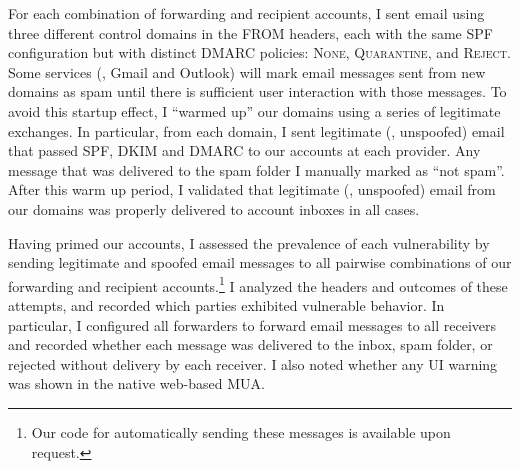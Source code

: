 For each combination of forwarding and recipient accounts, I sent
email using three different control domains in the FROM headers, each
with the same SPF configuration but with distinct DMARC policies:
\textsc{None}, \textsc{Quarantine}, and \textsc{Reject}.
%
Some services (\eg, Gmail and Outlook) will mark email messages sent
from new domains as spam until there is sufficient user interaction
with those messages.  To avoid this startup effect, I ``warmed up''
our domains using a series of legitimate exchanges.  In particular,
from each domain, I sent legitimate (\ie, unspoofed) email that
passed SPF, DKIM and DMARC to our accounts at each provider.  Any
message that was delivered to the spam folder I manually marked as
``not spam''.  After this warm up period, I validated that legitimate
(\ie, unspoofed) email from our domains was properly delivered to
account inboxes in all cases.

Having primed our accounts, I assessed the prevalence of each vulnerability by
sending legitimate and spoofed email messages to all
pairwise combinations of our forwarding and recipient accounts.\footnote{Our code for automatically sending these messages is available upon request.}  I
analyzed the headers and outcomes of these attempts, and recorded
which parties exhibited vulnerable behavior.  In particular, I
configured all forwarders to forward email messages to all receivers
and recorded whether each message was delivered to the inbox, spam
folder, or rejected without delivery by each receiver.  I also noted
whether any UI warning was shown in the native web-based MUA. 







